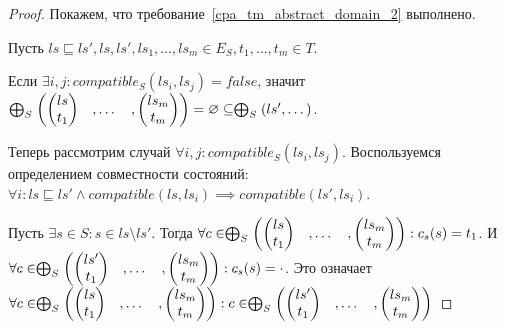 \begin{itemize}
\begin{proof}
Покажем, что требование~\ref{cpa_tm_abstract_domain_2} выполнено.

Пусть $ls \sqsubseteq ls', ls, ls', ls_1, \dots,ls_m \in E_S, t_1, \dots, t_m \in T$.

Если $\exists i, j: compatible_S(ls_i, ls_j) = false$, значит $\mathrel{\bigoplus}_S \begin{pmatrix}
\begin{pmatrix}
ls \\
t_1 
\end{pmatrix}& ,
\dots& ,
\begin{pmatrix}
ls_m \\
t_m 
\end{pmatrix}
\end{pmatrix}=\varnothing \subseteq \mathrel{\bigoplus}_S(ls', \dots)$.

Теперь рассмотрим случай $\forall i, j: compatible_S(ls_i, ls_j)$. 
Воспользуемся определением совместности состояний: $\forall i: ls \sqsubseteq ls' \land compatible(ls, ls_i) \implies compatible(ls', ls_i)$.

Пусть $\exists s \in S: s \in ls \setminus ls'$. Тогда
$\forall c \in \mathrel{\bigoplus}_S \begin{pmatrix}
\begin{pmatrix}
ls \\
t_1 
\end{pmatrix}& ,
\dots& ,
\begin{pmatrix}
ls_m \\
t_m 
\end{pmatrix}
\end{pmatrix}: c_s(s) = t_1$.
И $\forall c \in \mathrel{\bigoplus}_S \begin{pmatrix}
\begin{pmatrix}
ls' \\
t_1 
\end{pmatrix}& ,
\dots& ,
\begin{pmatrix}
ls_m \\
t_m 
\end{pmatrix}
\end{pmatrix}: c_s(s) = \cdot$.
Это означает
$\forall c \in \mathrel{\bigoplus}_S \begin{pmatrix}
\begin{pmatrix}
ls \\
t_1 
\end{pmatrix}& ,
\dots& ,
\begin{pmatrix}
ls_m \\
t_m 
\end{pmatrix}
\end{pmatrix}: c \in \mathrel{\bigoplus}_S \begin{pmatrix}
\begin{pmatrix}
ls' \\
t_1 
\end{pmatrix}& ,
\dots& ,
\begin{pmatrix}
ls_m \\
t_m 
\end{pmatrix}
\end{pmatrix}$


\end{proof}
\end{itemize}
